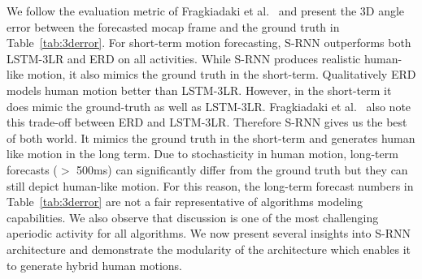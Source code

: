 \documentclass[10pt,twocolumn,letterpaper]{article}
\begin{document}
\iffalse%
We follow the evaluation metric of Fragkiadaki et al.~\cite{Fragkiadaki15} and present the 3D angle error between the forecasted mocap frame and the ground truth in Table~\ref{tab:3derror}.  For short-term motion forecasting, S-RNN outperforms both LSTM-3LR and ERD on all activities. While S-RNN produces realistic human-like motion, it also mimics the ground truth in the short-term. Qualitatively ERD models human motion better than LSTM-3LR. However, in the short-term it does mimic the ground-truth as well as LSTM-3LR. Fragkiadaki et al.~\cite{Fragkiadaki15} also note this trade-off between ERD and LSTM-3LR. Therefore S-RNN gives us the best of both world. It mimics  the ground truth in the short-term and generates human like motion in the long term. Due to stochasticity in human motion, long-term forecasts ($>$ 500ms) can significantly differ from the ground truth but they can still depict human-like motion. For this reason, the long-term forecast numbers in Table~\ref{tab:3derror} are not a fair representative of algorithms modeling capabilities. We also observe that discussion is one of the most challenging aperiodic activity for all algorithms. 
We now present several insights into S-RNN architecture and demonstrate the modularity of the architecture which enables it to generate hybrid human motions. 
\end{document}
